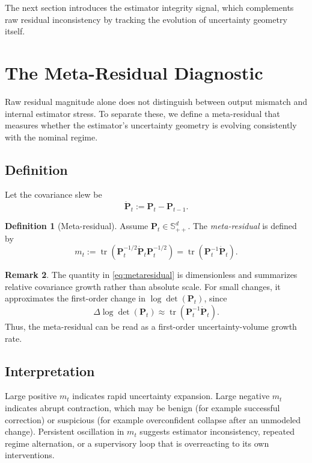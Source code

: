 \documentclass[11pt]{article}
\newcommand{\covar}{\mathbf{P}}
\newcommand{\metares}{m}
\newcommand{\trace}{\operatorname{tr}}
\theoremstyle{definition}
\newtheorem{definition}{Definition}[section]
\newtheorem{remark}[definition]{Remark}
\theoremstyle{plain}
\begin{document}
The next section introduces the estimator integrity signal, which complements raw residual inconsistency by tracking the evolution of uncertainty geometry itself.

\section{The Meta-Residual Diagnostic}

Raw residual magnitude alone does not distinguish between output mismatch and internal estimator stress. To separate these, we define a meta-residual that measures whether the estimator's uncertainty geometry is evolving consistently with the nominal regime.

\subsection{Definition}
Let the covariance slew be
\begin{equation}
    \dot{\covar}_t := \covar_t - \covar_{t-1}.
\end{equation}

\begin{definition}[Meta-residual]
Assume $\covar_t \in \mathbb{S}_{++}^d$. The \emph{meta-residual} is defined by
\begin{equation}
    \metares_t := \trace\!\left(\covar_t^{-1/2} \dot{\covar}_t \covar_t^{-1/2}\right)
    = \trace(\covar_t^{-1}\dot{\covar}_t).
    \label{eq:metaresidual}
\end{equation}
\end{definition}

\begin{remark}
The quantity in \cref{eq:metaresidual} is dimensionless and summarizes relative covariance growth rather than absolute scale. For small changes, it approximates the first-order change in $\log \det(\covar_t)$, since
\begin{equation}
    \Delta \log\det(\covar_t) \approx \trace(\covar_t^{-1}\dot{\covar}_t).
\end{equation}
Thus, the meta-residual can be read as a first-order uncertainty-volume growth rate.
\end{remark}

\subsection{Interpretation}
Large positive $\metares_t$ indicates rapid uncertainty expansion. Large negative $\metares_t$ indicates abrupt contraction, which may be benign (for example successful correction) or suspicious (for example overconfident collapse after an unmodeled change). Persistent oscillation in $\metares_t$ suggests estimator inconsistency, repeated regime alternation, or a supervisory loop that is overreacting to its own interventions.
\end{document}
